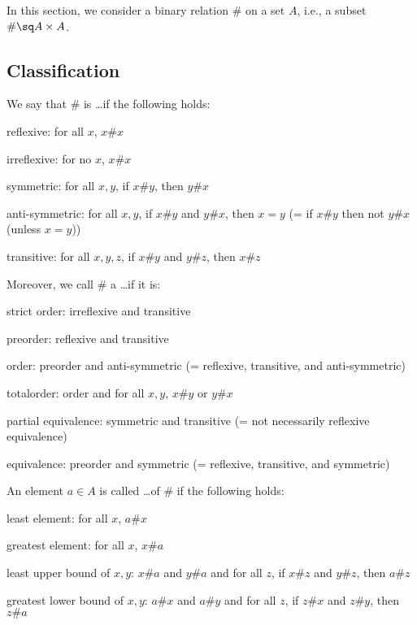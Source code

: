 In this section, we consider a binary relation $\#$ on a set $A$, i.e., a subset $\#\sq A\times A$.

\subsection{Classification}

\begin{definition}\label{def:math:binrel}
We say that $\#$ is \ldots if the following holds:
 \begin{compactitem}
 \item reflexive:  for all $x$, $x\# x$
 \item irreflexive\footnotemark: for no $x$, $x\# x$
 \item symmetric: for all $x,y$, if $x\# y$, then $y\# x$
 \item anti-symmetric\footnotemark: for all $x,y$, if $x\# y$ and $y\# x$, then $x=y$ (= if $x\# y$ then not $y\# x$ (unless $x=y$))
 \item transitive: for all $x,y,z$, if $x\# y$ and $y\# z$, then $x\# z$
 \end{compactitem}
 
Moreover, we call $\#$ a \ldots if it is:
 \begin{compactitem}
 \item strict order: irreflexive and transitive
 \item preorder: reflexive and transitive
 \item order\footnotemark: preorder and anti-symmetric (= reflexive, transitive, and anti-symmetric)
 \item total\footnotemark order: order and for all $x,y$, $x\# y$ or $y\# x$
 \item partial equivalence: symmetric and transitive (= not necessarily reflexive equivalence)
 \item equivalence: preorder and symmetric (= reflexive, transitive, and symmetric)
 \end{compactitem}

An element $a\in A$ is called \ldots of $\#$ if the following holds:
 \begin{compactitem}
  \item least element:  for all $x$, $a\# x$
  \item greatest element: for all $x$, $x\# a$
  \item least upper bound of $x,y$: $x\# a$ and $y\# a$ and for all $z$, if $x\# z$ and $y\# z$, then $a\# z$
  \item greatest lower bound of $x,y$: $a\# x$ and $a\# y$ and for all $z$, if $z\# x$ and $z\# y$, then $z\# a$
 \end{compactitem}
\end{definition}
\begin{multfootnotetext}{4}
\end{multfootnotetext}


